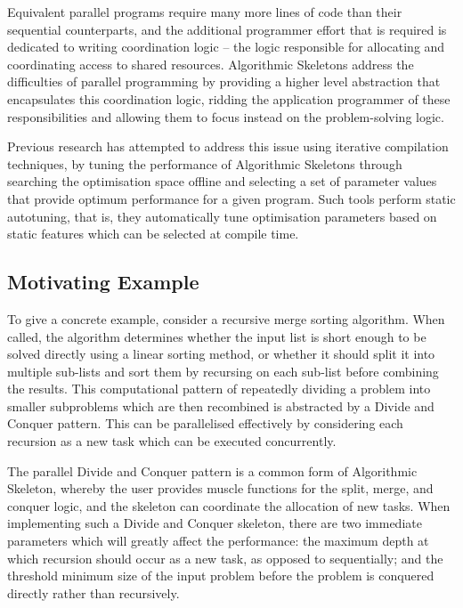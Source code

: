 Equivalent parallel programs require many more lines of code than
their sequential counterparts, and the additional programmer effort
that is required is dedicated to writing coordination logic -- the
logic responsible for allocating and coordinating access to shared
resources. Algorithmic Skeletons address the difficulties of parallel
programming by providing a higher level abstraction that encapsulates
this coordination logic, ridding the application programmer of these
responsibilities and allowing them to focus instead on the
problem-solving logic.

Previous research has attempted to address this issue using iterative
compilation techniques, by tuning the performance of Algorithmic
Skeletons through searching the optimisation space offline and
selecting a set of parameter values that provide optimum performance
for a given program. Such tools perform static autotuning, that is,
they automatically tune optimisation parameters based on static
features which can be selected at compile time.

\subsection{Motivating Example}

To give a concrete example, consider a recursive merge sorting
algorithm. When called, the algorithm determines whether the input
list is short enough to be solved directly using a linear sorting
method, or whether it should split it into multiple sub-lists and sort
them by recursing on each sub-list before combining the results. This
computational pattern of repeatedly dividing a problem into smaller
subproblems which are then recombined is abstracted by a Divide and
Conquer pattern. This can be parallelised effectively by considering
each recursion as a new task which can be executed concurrently.

The parallel Divide and Conquer pattern is a common form of
Algorithmic Skeleton, whereby the user provides muscle functions for
the split, merge, and conquer logic, and the skeleton can coordinate
the allocation of new tasks. When implementing such a Divide and
Conquer skeleton, there are two immediate parameters which will
greatly affect the performance: the maximum depth at which recursion
should occur as a new task, as opposed to sequentially; and the
threshold minimum size of the input problem before the problem is
conquered directly rather than recursively.

